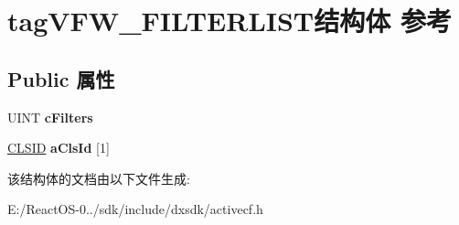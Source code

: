 \hypertarget{structtag_v_f_w___f_i_l_t_e_r_l_i_s_t}{}\section{tag\+V\+F\+W\+\_\+\+F\+I\+L\+T\+E\+R\+L\+I\+S\+T结构体 参考}
\label{structtag_v_f_w___f_i_l_t_e_r_l_i_s_t}
\subsection*{Public 属性}
\begin{DoxyCompactItemize}
\item 
\mbox{\label{structtag_v_f_w___f_i_l_t_e_r_l_i_s_t_a322ded6aeabc65d4b443b08cd1ec247a}} 
U\+I\+NT {\bfseries c\+Filters}
\item 
\mbox{\label{structtag_v_f_w___f_i_l_t_e_r_l_i_s_t_ab2968c8d16efbc16931dd0584c297293}} 
\hyperlink{struct___i_i_d}{C\+L\+S\+ID} {\bfseries a\+Cls\+Id} \mbox{[}1\mbox{]}
\end{DoxyCompactItemize}


该结构体的文档由以下文件生成\+:\begin{DoxyCompactItemize}
\item 
E\+:/\+React\+O\+S-\/0../sdk/include/dxsdk/activecf.\+h\end{DoxyCompactItemize}
